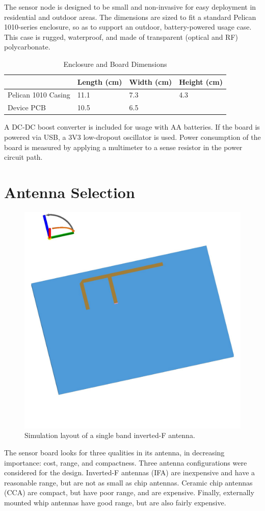 The sensor node is designed to be small and non-invasive for easy deployment in residential and outdoor areas. The dimensions are sized to fit a standard Pelican 1010-series enclosure, so as to support an outdoor, battery-powered usage case. This case is rugged, waterproof, and made of transparent (optical and RF) polycarbonate.

\begin{table}[h]
\begin{tabular}{@{}l|lll@{}}
                    & Length (cm) & Width (cm) & Height (cm) \\ \midrule
Pelican 1010 Casing & 11.1        & 7.3        & 4.3         \\
Device PCB          & 10.5        & 6.5        &            
\end{tabular}
\caption{Enclosure and Board Dimensions}
\label{dimensions}
\end{table}

A DC-DC boost converter is included for usage with AA batteries. If the board is powered via USB, a 3V3 low-dropout oscillator is used. Power consumption of the board is measured by applying a multimeter to a sense resistor in the power circuit path.

\section{Antenna Selection}

\begin{figure}[h]
\centering
\includegraphics[width=0.5\linewidth]{images/antenna-sketch}
\caption[IFA Layout]{Simulation layout of a single band inverted-F antenna.}
\label{fig:pifa}
\end{figure}

The sensor board looks for three qualities in its antenna, in decreasing importance: cost, range, and compactness. Three antenna configurations were considered for the design. Inverted-F antennas (IFA) are inexpensive and have a reasonable range, but are not as small as chip antennas. Ceramic chip antennas (CCA) are compact, but have poor range, and are expensive. Finally, externally mounted whip antennas have good range, but are also fairly expensive.

